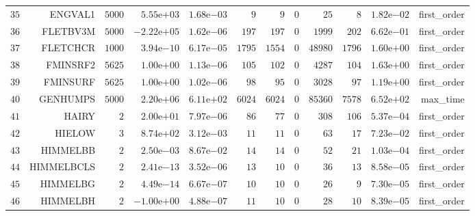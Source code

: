 \begin{longtable}{rrrrrrrrrrrr}
  \(    35\) & ENGVAL1 & \(  5000\) & \( 5.55\)e\(+03\) & \( 1.68\)e\(-03\) & \(     9\) & \(     9\) & \(     0\) & \(    25\) & \(     8\) & \( 1.82\)e\(-02\) & first\_order \\
  \(    36\) & FLETBV3M & \(  5000\) & \(-2.22\)e\(+05\) & \( 1.62\)e\(-06\) & \(   197\) & \(   197\) & \(     0\) & \(  1999\) & \(   202\) & \( 6.62\)e\(-01\) & first\_order \\
  \(    37\) & FLETCHCR & \(  1000\) & \( 3.94\)e\(-10\) & \( 6.17\)e\(-05\) & \(  1795\) & \(  1554\) & \(     0\) & \( 48980\) & \(  1796\) & \( 1.60\)e\(+00\) & first\_order \\
  \(    38\) & FMINSRF2 & \(  5625\) & \( 1.00\)e\(+00\) & \( 1.13\)e\(-06\) & \(   105\) & \(   102\) & \(     0\) & \(  4287\) & \(   104\) & \( 1.63\)e\(+00\) & first\_order \\
  \(    39\) & FMINSURF & \(  5625\) & \( 1.00\)e\(+00\) & \( 1.02\)e\(-06\) & \(    98\) & \(    95\) & \(     0\) & \(  3028\) & \(    97\) & \( 1.19\)e\(+00\) & first\_order \\
  \(    40\) & GENHUMPS & \(  5000\) & \( 2.20\)e\(+06\) & \( 6.11\)e\(+02\) & \(  6024\) & \(  6024\) & \(     0\) & \( 85360\) & \(  7578\) & \( 6.52\)e\(+02\) & max\_time \\
  \(    41\) & HAIRY & \(     2\) & \( 2.00\)e\(+01\) & \( 7.97\)e\(-06\) & \(    86\) & \(    77\) & \(     0\) & \(   308\) & \(   106\) & \( 5.37\)e\(-04\) & first\_order \\
  \(    42\) & HIELOW & \(     3\) & \( 8.74\)e\(+02\) & \( 3.12\)e\(-03\) & \(    11\) & \(    11\) & \(     0\) & \(    63\) & \(    17\) & \( 7.23\)e\(-02\) & first\_order \\
  \(    43\) & HIMMELBB & \(     2\) & \( 2.50\)e\(-03\) & \( 8.67\)e\(-02\) & \(    14\) & \(    14\) & \(     0\) & \(    52\) & \(    21\) & \( 1.03\)e\(-04\) & first\_order \\
  \(    44\) & HIMMELBCLS & \(     2\) & \( 2.41\)e\(-13\) & \( 3.52\)e\(-06\) & \(    13\) & \(    10\) & \(     0\) & \(    36\) & \(    13\) & \( 8.58\)e\(-05\) & first\_order \\
  \(    45\) & HIMMELBG & \(     2\) & \( 4.49\)e\(-14\) & \( 6.67\)e\(-07\) & \(    10\) & \(    10\) & \(     0\) & \(    26\) & \(     9\) & \( 7.30\)e\(-05\) & first\_order \\
  \(    46\) & HIMMELBH & \(     2\) & \(-1.00\)e\(+00\) & \( 4.88\)e\(-07\) & \(    11\) & \(    10\) & \(     0\) & \(    28\) & \(    10\) & \( 8.39\)e\(-05\) & first\_order \\

\end{longtable}
